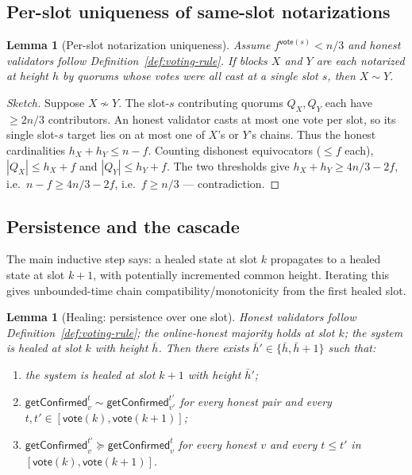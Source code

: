 \documentclass{article}
\newcommand{\vote}{\mathsf{vote}}
\newcommand{\OHM}{online-honest majority\xspace}
\newcommand{\getConfirmed}{\textsf{getConfirmed}\xspace}
\newcommand{\comm}[1]{\bar{#1}}
\theoremstyle{plain}
\newtheorem{lemma}[theorem]{Lemma}
\theoremstyle{definition}
\theoremstyle{remark}
\begin{document}
\subsection{Per-slot uniqueness of same-slot notarizations}

\begin{lemma}[Per-slot notarization uniqueness]\label{lem:notar-unique-per-slot}
Assume $f^{\vote(s)} < n/3$ and honest validators follow Definition~\ref{def:voting-rule}. If blocks $X$ and $Y$ are each notarized at height $h$ by quorums whose votes were all cast at a single slot $s$, then $X \sim Y$.
\end{lemma}

\begin{proof}[Sketch]
Suppose $X \not\sim Y$. The slot-$s$ contributing quorums $Q_X, Q_Y$ each have $\geq 2n/3$ contributors. An honest validator casts at most one vote per slot, so its single slot-$s$ target lies on at most one of $X$'s or $Y$'s chains. Thus the honest cardinalities $h_X + h_Y \leq n - f$. Counting dishonest equivocators ($\leq f$ each), $|Q_X| \leq h_X + f$ and $|Q_Y| \leq h_Y + f$. The two thresholds give $h_X + h_Y \geq 4n/3 - 2f$, i.e.\ $n - f \geq 4n/3 - 2f$, i.e.\ $f \geq n/3$ --- contradiction.
\end{proof}

\subsection{Persistence and the cascade}

The main inductive step says: a healed state at slot $k$ propagates to a healed state at slot $k+1$, with potentially incremented common height. Iterating this gives unbounded-time chain compatibility/monotonicity from the first healed slot.

\begin{lemma}[Healing: persistence over one slot]\label{lem:healing-persistence}
Honest validators follow Definition~\ref{def:voting-rule}; the \OHM holds at slot $k$; the system is healed at slot $k$ with height $\comm{h}$. Then there exists $\comm{h}' \in \{\comm{h}, \comm{h}+1\}$ such that:
\begin{enumerate}
\item the system is healed at slot $k+1$ with height $\comm{h}'$;
\item $\getConfirmed_v^t \sim \getConfirmed_{v'}^{t'}$ for every honest pair and every $t, t' \in [\vote(k), \vote(k+1)]$;
\item $\getConfirmed_v^{t'} \succeq \getConfirmed_v^t$ for every honest $v$ and every $t \leq t'$ in $[\vote(k), \vote(k+1)]$.
\end{enumerate}
\end{lemma}
\end{document}
